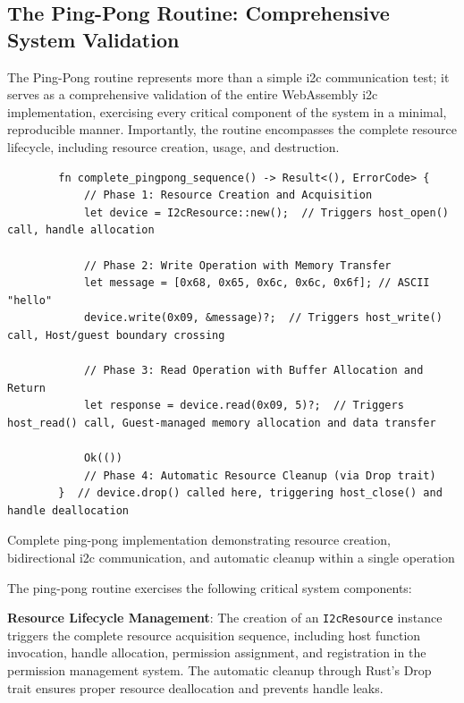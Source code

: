 \subsection{The Ping-Pong Routine: Comprehensive System Validation}
\label{subsec:ping-pong-routine}

The Ping-Pong routine represents more than a simple \acrshort{i2c} communication test; it serves as a comprehensive validation of the entire WebAssembly \acrshort{i2c} implementation, exercising every critical component of the system in a minimal, reproducible manner. Importantly, the routine encompasses the complete resource lifecycle, including resource creation, usage, and destruction.

\begin{listing}[H]
    \begin{verbatim}
        fn complete_pingpong_sequence() -> Result<(), ErrorCode> {
            // Phase 1: Resource Creation and Acquisition
            let device = I2cResource::new();  // Triggers host_open() call, handle allocation
            
            // Phase 2: Write Operation with Memory Transfer
            let message = [0x68, 0x65, 0x6c, 0x6c, 0x6f]; // ASCII "hello"
            device.write(0x09, &message)?;  // Triggers host_write() call, Host/guest boundary crossing
            
            // Phase 3: Read Operation with Buffer Allocation and Return
            let response = device.read(0x09, 5)?;  // Triggers host_read() call, Guest-managed memory allocation and data transfer
            
            Ok(())
            // Phase 4: Automatic Resource Cleanup (via Drop trait)
        }  // device.drop() called here, triggering host_close() and handle deallocation
    \end{verbatim}
    \caption{Complete ping-pong implementation demonstrating resource creation, bidirectional \acrshort{i2c} communication, and automatic cleanup within a single operation}
    \label{lst:complete-pingpong}
\end{listing}

The ping-pong routine exercises the following critical system components:

\textbf{Resource Lifecycle Management}: The creation of an \texttt{I2cResource} instance triggers the complete resource acquisition sequence, including host function invocation, handle allocation, permission assignment, and registration in the permission management system. The automatic cleanup through Rust's Drop trait ensures proper resource deallocation and prevents handle leaks.

